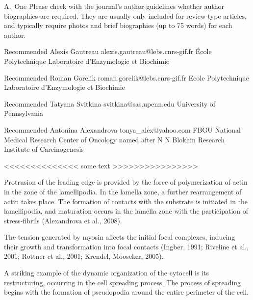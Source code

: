 \documentclass[alpha-refs]{wiley-article}
\begin{document}
\printendnotes

\newpage




% 
\iffalse
\begin{biography}{A.~One}
Please check with the journal's author guidelines whether author biographies are required. They are usually only included for review-type articles, and typically require photos and brief biographies (up to 75 words) for each author.
\bigskip
\bigskip
\end{biography}


Recommended
Alexis Gautreau
alexis.gautreau@lebs.cnrs-gif.fr
École Polytechnique
Laboratoire d'Enzymologie et Biochimie

Recommended
Roman Gorelik
roman.gorelik@lebs.cnrs-gif.fr
Ecole Polytechnique
Laboratoire d'Enzymologie et Biochimie

Recommended
Tatyana Svitkina
svitkina@sas.upenn.edu
University of Pennsylvania

Recommended
Antonina Alexandrova
tonya_alex@yahoo.com
FBGU National Medical Research Center of Oncology named after N N Blokhin Research Institute of Carcinogenesis

<<<<<<<<<<<<<< some text >>>>>>>>>>>>>>>>

Protrusion of the leading edge is provided by the force of polymerization of actin in the zone of the lamellipodia. In the lamella zone, a further rearrangement of actin takes place.
The formation of contacts with the substrate is initiated in the lamellipodia, and maturation occurs in the lamella zone with the participation of stress-fibrils (Alexandrova et al., 2008).

The tension generated by myosin affects the initial focal complexes, inducing their growth and transformation into focal contacts (Ingber, 1991; Riveline et al., 2001; Rottner et al., 2001; Krendel, Mooseker, 2005).

A striking example of the dynamic organization of the cytocell is its restructuring, occurring in the cell spreading process.
The process of spreading begins with the formation of pseudopodia around the entire perimeter of the cell.
\end{document}
